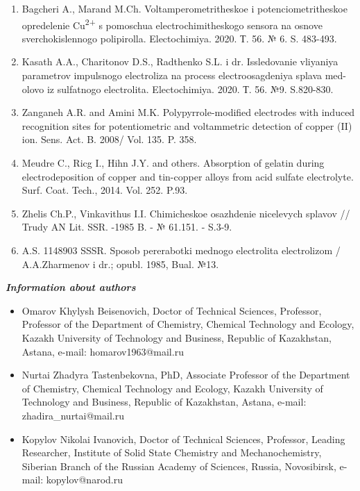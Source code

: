 \begin{enumerate}
\item
Bagcheri A., Marand M.Ch. Voltamperometritheskoe i
potenciometritheskoe opredelenie Cu\textsuperscript{2+} s pomoschua
electrochimitheskogo sensora na osnove sverchokislennogo polipirolla.
Electochimiya. 2020. Т. 56. № 6. S. 483-493.

\item
Kasath A.A., Charitonov D.S., Radthenko S.L. i dr. Issledovanie
vliyaniya parametrov impulsnogo electroliza na process electroosagdeniya
splava med-olovo iz sulfatnogo electrolita. Electochimiya. 2020. Т. 56.
№9. S.820-830.

\item
Zanganeh A.R. and Amini M.K. Polypyrrole-modified electrodes with
induced recognition sites for potentiometric and voltammetric detection
of copper (II) ion. Sens. Act. B. 2008/ Vol. 135. P. 358.

\item
Meudre C., Ricg I., Hihn J.Y. and others. Absorption of gelatin
during electrodeposition of copper and tin-copper alloys from acid
sulfate electrolyte. Surf. Coat. Tech., 2014. Vol. 252. P.93.

\item
Zhelis Ch.P., Vinkavithus I.I. Chimicheskoe osazhdenie nicelevych
splavov // Trudy AN Lit. SSR. -1985 B. - № 61.151. - S.3-9.

\item
A.S. 1148903 SSSR. Sposob pererabotki mednogo electrolita
electrolizom / A.A.Zharmenov i dr.; opubl. 1985, Bual. №13.
\end{enumerate}

\emph{{\bfseries Information about authors}}

\begin{itemize}
\item
Omarov Khylysh Beisenovich, Doctor of Technical Sciences, Professor,
Professor of the Department of Chemistry, Chemical Technology and
Ecology, Kazakh University of Technology and Business, Republic of
Kazakhstan, Astana, e-mail:
homarov1963@mail.ru

\item
Nurtai Zhadyra Tastenbekovna, PhD, Associate Professor of the Department
of Chemistry, Chemical Technology and Ecology, Kazakh University of
Technology and Business, Republic of Kazakhstan, Astana, e-mail:
zhadira\_nurtai@mail.ru

\item
Kopylov Nikolai Ivanovich, Doctor of Technical Sciences, Professor,
Leading Researcher, Institute of Solid State Chemistry and
Mechanochemistry, Siberian Branch of the Russian Academy of Sciences,
Russia, Novosibirsk, e-mail:
kopylov@narod.ru
\end{itemize}

